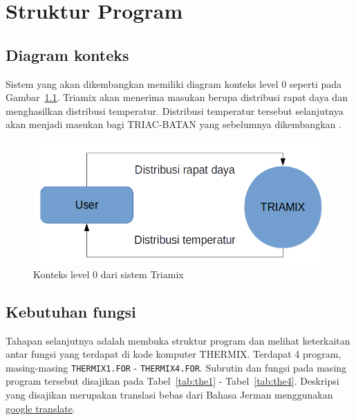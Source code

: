\documentclass[a4paper,11pt]{report}
\renewcommand{\figurename}{Gambar}
\renewcommand{\tablename}{Tabel}
\begin{document}
\chapter{Struktur Program}

\section{Diagram konteks}
Sistem yang akan dikembangkan memiliki diagram konteks level 0 seperti pada \figurename~\ref{fig:level0}. Triamix akan menerima masukan berupa distribusi rapat daya dan menghasilkan distribusi temperatur. Distribusi temperatur tersebut selanjutnya akan menjadi masukan bagi TRIAC-BATAN yang sebelumnya dikembangkan \cite{triac1}.

\begin{figure}[h!]
  \begin{center}
    \includegraphics[scale=.4]{pics/contextLevel0.png}
    \caption{Konteks level 0 dari sistem Triamix}
    \label{fig:level0}
  \end{center}
\end{figure}

\section{Kebutuhan fungsi}
Tahapan selanjutnya adalah membuka struktur program dan melihat keterkaitan antar fungsi yang terdapat di kode komputer THERMIX. Terdapat 4 program, masing-masing \texttt{THERMIX1.FOR} - \texttt{THERMIX4.FOR}. Subrutin dan fungsi pada masing program tersebut disajikan pada \tablename~\ref{tab:the1} - \tablename~\ref{tab:the4}. Deskripsi yang disajikan merupakan translasi bebas dari Bahasa Jerman menggunakan \href{https://translate.google.com/}{google translate}.
\end{document}
